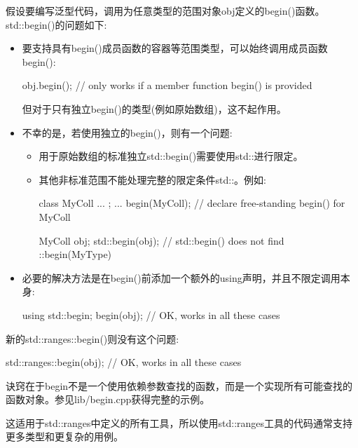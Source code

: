 假设要编写泛型代码，调用为任意类型的范围对象obj定义的begin()函数。std::begin()的问题如下:

\begin{itemize}
\item
要支持具有begin()成员函数的容器等范围类型，可以始终调用成员函数begin():

\begin{cpp}
obj.begin(); // only works if a member function begin() is provided
\end{cpp}

但对于只有独立begin()的类型(例如原始数组)，这不起作用。

\item
不幸的是，若使用独立的begin()，则有一个问题:

\begin{itemize}
\item
用于原始数组的标准独立std::begin()需要使用std::进行限定。

\item
其他非标准范围不能处理完整的限定条件std::。例如:

\begin{cpp}
class MyColl {
	...
};
... begin(MyColl); // declare free-standing begin() for MyColl

MyColl obj;
std::begin(obj); // std::begin() does not find ::begin(MyType)
\end{cpp}
\end{itemize}

\item
必要的解决方法是在begin()前添加一个额外的using声明，并且不限定调用本身:

\begin{cpp}
using std::begin;
begin(obj); // OK, works in all these cases
\end{cpp}
\end{itemize}

新的std::ranges::begin()则没有这个问题:

\begin{cpp}
std::ranges::begin(obj); // OK, works in all these cases
\end{cpp}

诀窍在于begin不是一个使用依赖参数查找的函数，而是一个实现所有可能查找的函数对象。参见lib/begin.cpp获得完整的示例。

这适用于std::ranges中定义的所有工具，所以使用std::ranges工具的代码通常支持更多类型和更复杂的用例。


